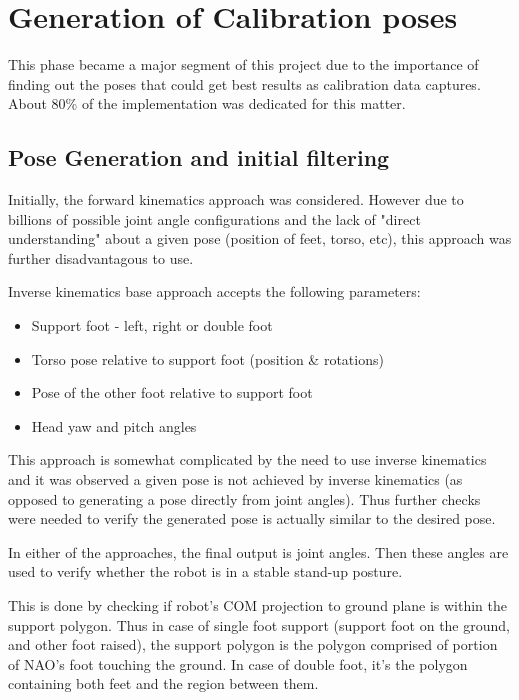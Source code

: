 \documentclass[english, printversion, nomenclature, notitle]{tuvisionthesis} %
\begin{document}
\section{Generation of Calibration poses}
\label{sec:poseGen}

This phase became a major segment of this project due to the importance of finding out the poses that could get best results as calibration data captures. About 80\% of the implementation was dedicated for this matter.

\subsection{Pose Generation and initial filtering}

Initially, the forward kinematics approach was considered. However due to billions of possible joint angle configurations and the lack of "direct understanding" about a given pose (position of feet, torso, etc), this approach was further disadvantagous to use.

Inverse kinematics base approach accepts the following parameters:
\begin{itemize}
	\item Support foot - left, right or double foot
	\item Torso pose relative to support foot (position \& rotations)
	\item Pose of the other foot relative to support foot
	\item Head yaw and pitch angles
\end{itemize}
This approach is somewhat complicated by the need to use inverse kinematics and it was observed a given pose is not achieved by inverse kinematics (as opposed to generating a pose directly from joint angles). Thus further checks were needed to verify the generated pose is actually similar to the desired pose.

In either of the approaches, the final output is joint angles. Then these angles are used to verify whether the robot is in a stable stand-up posture.

This is done by checking if robot's COM projection to ground plane is within the support polygon. Thus in case of single foot support (support foot on the ground, and other foot raised), the support polygon is the polygon comprised of portion of NAO's foot touching the ground. In case of double foot, it's the polygon containing both feet and the region between them. 
\end{document}

